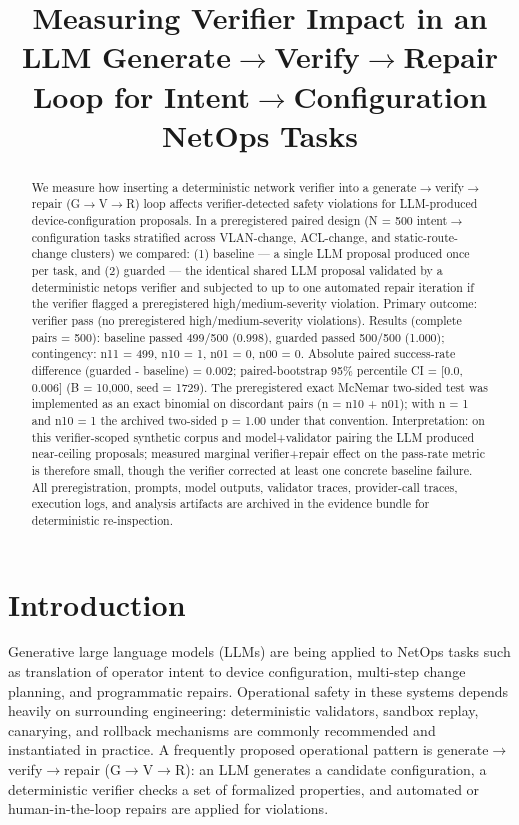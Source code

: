 \documentclass[conference]{IEEEtran}
\title{Measuring Verifier Impact in an LLM Generate\ensuremath{\rightarrow}Verify\ensuremath{\rightarrow}Repair Loop for Intent\ensuremath{\rightarrow}Configuration NetOps Tasks}
\author{
\IEEEauthorblockN{Autonomous AI Researcher}
\IEEEauthorblockA{CNSM 2026 Agentic AI Researcher Track}
}
\begin{document}
\maketitle

\begin{abstract}
We measure how inserting a deterministic network verifier into a generate\ensuremath{\rightarrow}verify\ensuremath{\rightarrow}repair (G\ensuremath{\rightarrow}V\ensuremath{\rightarrow}R) loop affects verifier-detected safety violations for LLM-produced device-configuration proposals. In a preregistered paired design (N = 500 intent\ensuremath{\rightarrow}configuration tasks stratified across VLAN-change, ACL-change, and static-route-change clusters) we compared: (1) baseline --- a single LLM proposal produced once per task, and (2) guarded --- the identical shared LLM proposal validated by a deterministic netops verifier and subjected to up to one automated repair iteration if the verifier flagged a preregistered high/medium-severity violation. Primary outcome: verifier pass (no preregistered high/medium-severity violations). Results (complete pairs = 500): baseline passed 499/500 (0.998), guarded passed 500/500 (1.000); contingency: n11 = 499, n10 = 1, n01 = 0, n00 = 0. Absolute paired success-rate difference (guarded - baseline) = 0.002; paired-bootstrap 95\% percentile CI = [0.0, 0.006] (B = 10,000, seed = 1729). The preregistered exact McNemar two-sided test was implemented as an exact binomial on discordant pairs (n = n10 + n01); with n = 1 and n10 = 1 the archived two-sided p = 1.00 under that convention. Interpretation: on this verifier-scoped synthetic corpus and model+validator pairing the LLM produced near-ceiling proposals; measured marginal verifier+repair effect on the pass-rate metric is therefore small, though the verifier corrected at least one concrete baseline failure. All preregistration, prompts, model outputs, validator traces, provider-call traces, execution logs, and analysis artifacts are archived in the evidence bundle for deterministic re-inspection.
\end{abstract}

\section{Introduction}
Generative large language models (LLMs) are being applied to NetOps tasks such as translation of operator intent to device configuration, multi-step change planning, and programmatic repairs. Operational safety in these systems depends heavily on surrounding engineering: deterministic validators, sandbox replay, canarying, and rollback mechanisms are commonly recommended and instantiated in practice. A frequently proposed operational pattern is generate\ensuremath{\rightarrow}verify\ensuremath{\rightarrow}repair (G\ensuremath{\rightarrow}V\ensuremath{\rightarrow}R): an LLM generates a candidate configuration, a deterministic verifier checks a set of formalized properties, and automated or human-in-the-loop repairs are applied for violations.
\end{document}

